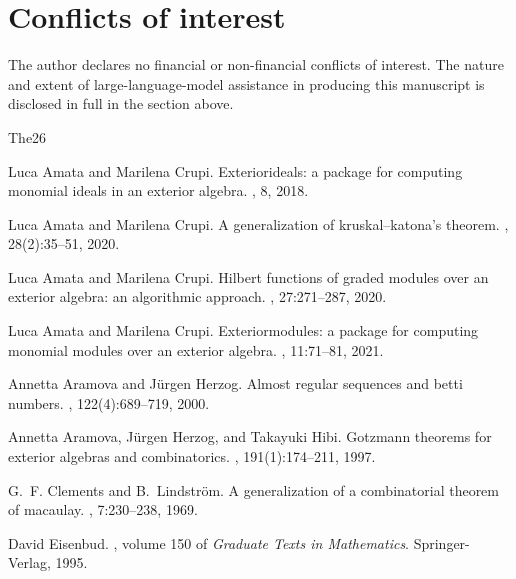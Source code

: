 \documentclass[11pt, a4paper, abstract=yes]{scrartcl}
\theoremstyle{definition}
\theoremstyle{remark}
\theoremstyle{plain}
\begin{document}
\section*{Conflicts of interest}
\label{sec:orgade77a7}
The author declares no financial or non-financial conflicts of interest. The nature and extent of
large-language-model assistance in producing this manuscript is disclosed in full in the section
above.
\begin{thebibliography}{{The}26}

Luca Amata and Marilena Crupi.
\newblock Exteriorideals: a package for computing monomial ideals in an
  exterior algebra.
, 8, 2018.

Luca Amata and Marilena Crupi.
\newblock A generalization of kruskal--katona's theorem.
, 28(2):35--51, 2020.

Luca Amata and Marilena Crupi.
\newblock Hilbert functions of graded modules over an exterior algebra: an
  algorithmic approach.
, 27:271--287, 2020.

Luca Amata and Marilena Crupi.
\newblock Exteriormodules: a package for computing monomial modules over an
  exterior algebra.
, 11:71--81, 2021.

Annetta Aramova and J{\"u}rgen Herzog.
\newblock Almost regular sequences and betti numbers.
, 122(4):689--719, 2000.

Annetta Aramova, J{\"u}rgen Herzog, and Takayuki Hibi.
\newblock Gotzmann theorems for exterior algebras and combinatorics.
, 191(1):174--211, 1997.

G.~F. Clements and B.~Lindstr{\"o}m.
\newblock A generalization of a combinatorial theorem of macaulay.
, 7:230--238, 1969.

David Eisenbud.
,
  volume 150 of {\em Graduate Texts in Mathematics}.
\newblock Springer-Verlag, 1995.


\end{thebibliography}
\end{document}
